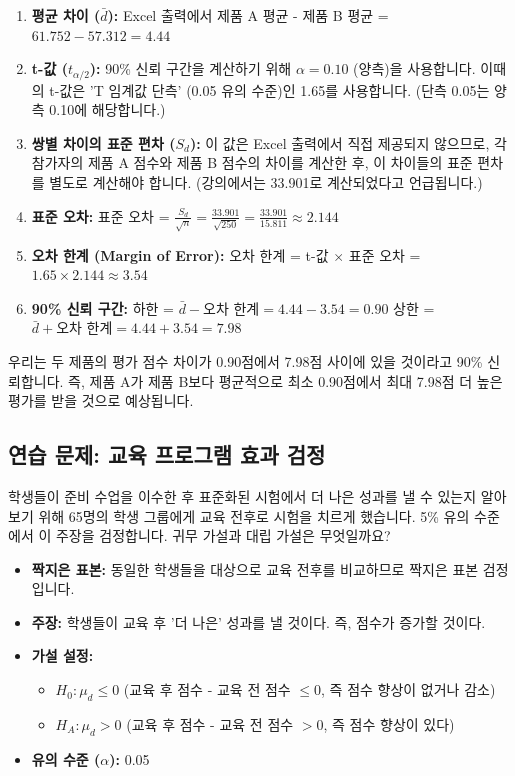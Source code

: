 \documentclass[11pt,a4paper]{book}
\theoremstyle{definition}
\begin{document}
\begin{enumerate}
    \item \textbf{평균 차이 ($\bar{d}$):}
    Excel 출력에서 제품 A 평균 - 제품 B 평균 = $61.752 - 57.312 = 4.44$
    \item \textbf{t-값 ($t_{\alpha/2}$):}
    90\% 신뢰 구간을 계산하기 위해 $\alpha = 0.10$ (양측)을 사용합니다. 이때의 t-값은 'T 임계값 단측' (0.05 유의 수준)인 1.65를 사용합니다. (단측 0.05는 양측 0.10에 해당합니다.)
    \item \textbf{쌍별 차이의 표준 편차 ($S_d$):}
    이 값은 Excel 출력에서 직접 제공되지 않으므로, 각 참가자의 제품 A 점수와 제품 B 점수의 차이를 계산한 후, 이 차이들의 표준 편차를 별도로 계산해야 합니다. (강의에서는 33.901로 계산되었다고 언급됩니다.)
    \item \textbf{표준 오차:}
    표준 오차 = $\frac{S_d}{\sqrt{n}} = \frac{33.901}{\sqrt{250}} = \frac{33.901}{15.811} \approx 2.144$
    \item \textbf{오차 한계 (Margin of Error):}
    오차 한계 = t-값 $\times$ 표준 오차 = $1.65 \times 2.144 \approx 3.54$
    \item \textbf{90\% 신뢰 구간:}
    하한 = $\bar{d} - \text{오차 한계} = 4.44 - 3.54 = 0.90$
    상한 = $\bar{d} + \text{오차 한계} = 4.44 + 3.54 = 7.98$
\end{enumerate}

\begin{summarybox}[title=90\% 신뢰 구간 해석]
우리는 두 제품의 평가 점수 차이가 0.90점에서 7.98점 사이에 있을 것이라고 90\% 신뢰합니다. 즉, 제품 A가 제품 B보다 평균적으로 최소 0.90점에서 최대 7.98점 더 높은 평가를 받을 것으로 예상됩니다.
\end{summarybox}

\subsection{연습 문제: 교육 프로그램 효과 검정}
\begin{examplebox}[title=시나리오:]
학생들이 준비 수업을 이수한 후 표준화된 시험에서 더 나은 성과를 낼 수 있는지 알아보기 위해 65명의 학생 그룹에게 교육 전후로 시험을 치르게 했습니다. 5\% 유의 수준에서 이 주장을 검정합니다. 귀무 가설과 대립 가설은 무엇일까요?
\end{examplebox}

\begin{itemize}
    \item \textbf{짝지은 표본:} 동일한 학생들을 대상으로 교육 전후를 비교하므로 짝지은 표본 검정입니다.
    \item \textbf{주장:} 학생들이 교육 후 '더 나은' 성과를 낼 것이다. 즉, 점수가 증가할 것이다.
    \item \textbf{가설 설정:}
    \begin{itemize}
        \item $H_0: \mu_d \le 0$ (교육 후 점수 - 교육 전 점수 $\le 0$, 즉 점수 향상이 없거나 감소)
        \item $H_A: \mu_d > 0$ (교육 후 점수 - 교육 전 점수 $> 0$, 즉 점수 향상이 있다)
    \end{itemize}
    \item \textbf{유의 수준 ($\alpha$):} 0.05
\end{itemize}
\end{document}
